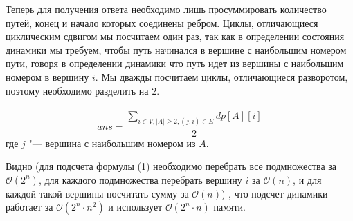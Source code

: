 \documentclass{article}
\begin{document}
Теперь для получения ответа необходимо лишь просуммировать количество путей, конец и начало которых соединены ребром. Циклы, отличающиеся циклическим сдвигом мы посчитаем один раз, так как в определении состояния динамики мы требуем, чтобы путь начинался в вершине с наибольшим номером пути, говоря в определении динамики что путь идет из вершины с наибольшим номером в вершину $i$. Мы дважды посчитаем циклы, отличающиеся разворотом, поэтому необходимо разделить на 2.\\\\
$$ans = \frac{\sum_{i \in V, |A| \geq 2, (j, i) \in E}dp[A][i]}{2}$$ где $j$ "--- вершина с наибольшим номером из $A$. 

Видно (для подсчета формулы (1) необходимо перебрать все подмножества за $\mathcal{O}(2^{n})$, для каждого подмножества перебрать вершину $i$ за $\mathcal{O}(n)$, и для каждой такой вершины посчитать сумму за $\mathcal{O}(n)$) , что подсчет динамики работает за $\mathcal{O}(2^{n} \cdot n^{2})$ и использует $\mathcal{O}({2^{n} \cdot n})$ памяти.
\end{document}
